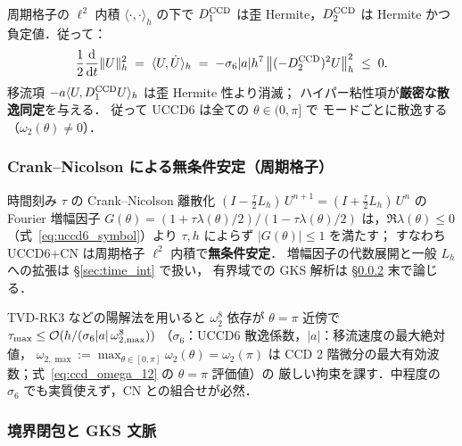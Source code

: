 周期格子の $\ell^2$ 内積 $\langle\cdot,\cdot\rangle_h$ の下で
$D_1^{\mathrm{CCD}}$ は歪 Hermite，$D_2^{\mathrm{CCD}}$ は Hermite かつ負定値．従って：
\begin{equation}
  \frac{1}{2}\frac{\mathrm{d}}{\mathrm{d}t}\|U\|_h^{2}
  \;=\; \langle U, \dot U\rangle_h
  \;=\; -\sigma_6|a|h^{7}\,\bigl\|(-D_2^{\mathrm{CCD}})^{2}U\bigr\|_h^{2}
  \;\le\; 0.
  \label{eq:uccd6_energy_id}
\end{equation}
移流項 $-a\langle U, D_1^{\mathrm{CCD}}U\rangle_h$ は歪 Hermite 性より消滅；
ハイパー粘性項が\textbf{厳密な散逸同定}を与える．
従って UCCD6 は全ての $\theta\in(0,\pi]$ で
モードごとに散逸する（$\omega_2(\theta)\ne 0$）．

\subsubsection{Crank--Nicolson による無条件安定（周期格子）}
\label{sec:uccd6_cn_stability}

時間刻み $\tau$ の Crank--Nicolson 離散化
$(I - \tfrac{\tau}{2}L_h)\,U^{n+1} = (I + \tfrac{\tau}{2}L_h)\,U^{n}$
の Fourier 増幅因子
$G(\theta) = (1+\tau\lambda(\theta)/2)/(1-\tau\lambda(\theta)/2)$
は，$\Re\lambda(\theta)\le 0$（式~\eqref{eq:uccd6_symbol}）より
$\tau, h$ によらず $|G(\theta)|\le 1$ を満たす；
すなわち UCCD6+CN は周期格子 $\ell^2$ 内積で\textbf{無条件安定}．
増幅因子の代数展開と一般 $L_h$ への拡張は §\ref{sec:time_int} で扱い，
有界域での GKS 解析は §\ref{sec:uccd6_boundary} 末で論じる．

\begin{remark}
\label{rem:uccd6_explicit_cfl}
TVD-RK3 などの陽解法を用いると $\omega_2^8$ 依存が $\theta=\pi$ 近傍で
$\tau_{\max}\le \mathcal{O}(h/(\sigma_6|a|\,\omega_{2,\max}^8))$
（$\sigma_6$：UCCD6 散逸係数，$|a|$：移流速度の最大絶対値，
$\omega_{2,\max} := \max_{\theta\in[0,\pi]}\omega_2(\theta) = \omega_2(\pi)$ は
CCD 2 階微分の最大有効波数；式~\eqref{eq:ccd_omega_12} の $\theta=\pi$ 評価値）の
厳しい拘束を課す．中程度の $\sigma_6$ でも実質使えず，CN との組合せが必然．
\end{remark}

\subsubsection{境界閉包と GKS 文脈}
\label{sec:uccd6_boundary}

